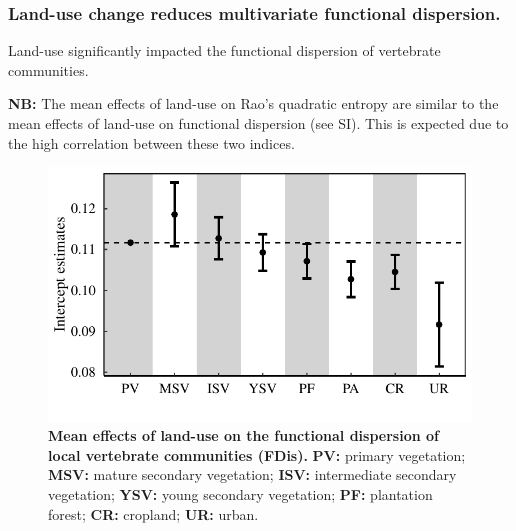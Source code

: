 \subsubsection{Land-use change reduces multivariate functional dispersion.}

Land-use significantly impacted the functional dispersion of vertebrate communities. 

\textbf{NB:} The mean effects of land-use on Rao's quadratic entropy are similar to the mean effects of land-use on functional dispersion (see SI). This is expected due to the high correlation between these two indices.

\begin{figure}[h!]
\centering
\includegraphics[scale=0.70]{figures/chapter3/FDis/Mean_effect}
\caption[Mean effects of land-use on the functional dispersion of local vertebrate communities]{\textbf{Mean effects of land-use on the functional dispersion of local vertebrate communities (FDis).} \textbf{PV:} primary vegetation; \textbf{MSV:} mature secondary vegetation; \textbf{ISV:} intermediate secondary vegetation; \textbf{YSV:} young secondary vegetation; \textbf{PF:} plantation forest; \textbf{CR:} cropland; \textbf{UR:} urban.}
\label{LU_mean_RaoQ}
\end{figure}

